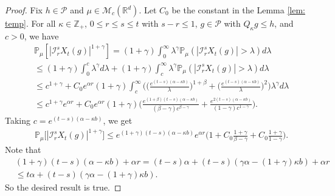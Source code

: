 \documentclass[EJP]{ejpecp} %
\begin{document}
\begin{proof}
  Fix $h \in \mathcal P$ and $\mu \in \mathcal M_c(\mathbb R^d)$. Let $C_0$ be the constant in the Lemma \ref{lem: temp}.
  For all $\kappa \in \mathbb Z_+$,  $0\leq r\leq s\leq t$ with $s-r \leq 1$,  $g\in \mathcal P$ with $Q_{\kappa} g \leq h$, and $c>0$, we have
  \begin{align}
     & \mathbb P_\mu[|\mathcal I_r^sX_t(g)|^{1+\gamma}]
       = (1+\gamma)\int_0^\infty \lambda^{\gamma} \mathbb P_{\mu}(|\mathcal I_r^sX_t(g)|>\lambda) d\lambda \\
     & \leq (1+\gamma)\int_0^c \lambda^{\gamma} d\lambda +(1+\gamma)\int_c^\infty \lambda^{\gamma}\mathbb P_\mu(|\mathcal I_r^sX_t(g)|> \lambda) d\lambda \\
    & \leq c^{1+\gamma} + C_0  e^{\alpha r}(1+\gamma)\int_c^\infty \bigg(\Big(\frac{e^{(t-s)(\alpha - \kappa b)}}{\lambda}\Big)^{1+\beta}+\Big(\frac{e^{(t-s)(\alpha - \kappa b)}}{\lambda}\Big)^{2}\bigg)\lambda^{\gamma}d\lambda \\
    & \leq c^{1+\gamma} e^{\alpha r} + C_0e^{\alpha r}(1+\gamma)\Big(  \frac{e^{(1+\beta)(t-s)(\alpha- \kappa b)}}{(\beta - \gamma)c^{\beta - \gamma}}  + \frac{e^{2(t-s)(\alpha- \kappa b)}}{(1 - \gamma)c^{1 - \gamma}} \Big).
  \end{align}
  Taking $c = e^{(t-s)(\alpha- \kappa b)}$, we get
  \begin{align}
     & \mathbb P_\mu\big[|\mathcal I_r^s X_t(g)|^{1+\gamma}\big]
      \leq e^{(1+\gamma)(t-s)(\alpha- \kappa b)} e^{\alpha r}\Big(1+ C_0 \frac{1+\gamma}{\beta - \gamma}+ C_0 \frac{1+\gamma}{1 - \gamma}\Big).
  \end{align}
  Note that
  \begin{align}
    & (1+\gamma) (t-s) (\alpha- \kappa b) + \alpha r
      = (t-s)\alpha+(t-s) (\gamma \alpha- (1+\gamma )\kappa b)+\alpha r \\
    & \leq t\alpha+(t-s) (\gamma \alpha- (1+\gamma)\kappa b).
  \end{align}
  So the desired result is true.
\end{proof}
\end{document}
